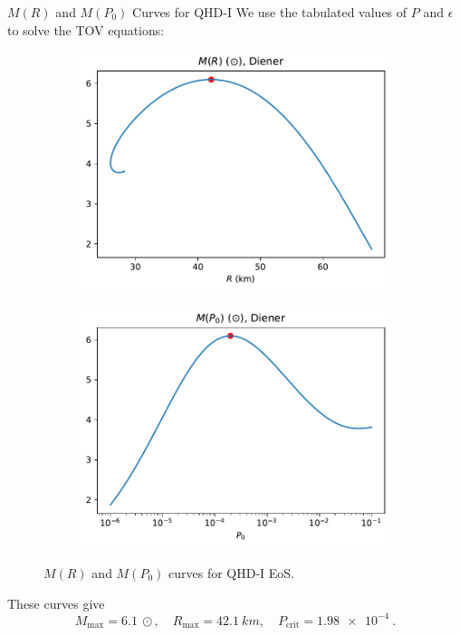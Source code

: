 \documentclass[handout]{beamer}
\begin{document}
    \begin{frame}{$M(R)$ and $M(P_0)$ Curves for QHD-I}
        We use the tabulated values of $P$ and $\epsilon$ to solve the TOV equations: \pause
        \begin{figure}[h!]
            \centering
            \begin{subfigure}{.5\textwidth}
                \includegraphics[width = \textwidth]{../paper/images/qhd1/r_analysis.pdf}
            \end{subfigure}%
            \begin{subfigure}{.5\textwidth}
                \includegraphics[width = \textwidth]{../paper/images/qhd1/p0_analysis.pdf}
            \end{subfigure}
            \caption[]{$M(R)$ and $M(P_0)$ curves for QHD-I EoS.}
        \end{figure}\pause
        \vspace{-3pt}
        These curves give \[M_\text{max} = \SI{6.1}{\odot}, \quad R_\text{max} = \SI{42.1}{km}, \quad P_\text{crit} = \SI{1.98e-4}{}.\]
    \end{frame}
\end{document}
